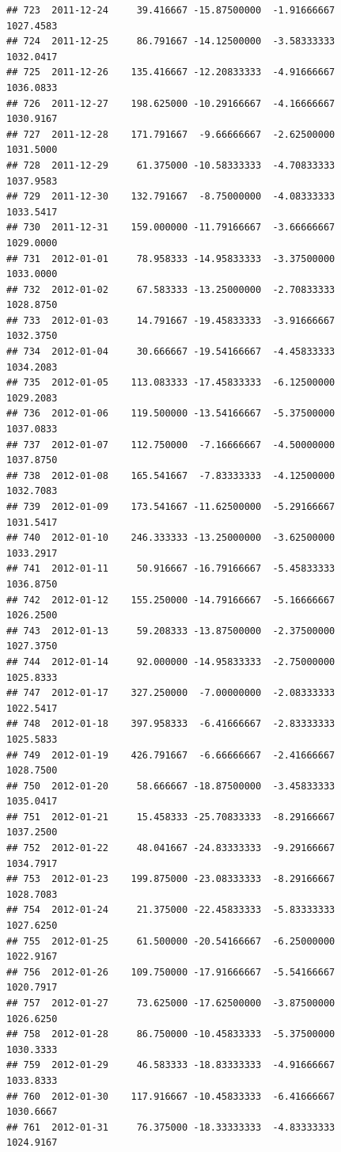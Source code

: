 \documentclass[
]{article}
\begin{document}
\begin{verbatim}
## 723  2011-12-24     39.416667 -15.87500000  -1.91666667    1027.4583
## 724  2011-12-25     86.791667 -14.12500000  -3.58333333    1032.0417
## 725  2011-12-26    135.416667 -12.20833333  -4.91666667    1036.0833
## 726  2011-12-27    198.625000 -10.29166667  -4.16666667    1030.9167
## 727  2011-12-28    171.791667  -9.66666667  -2.62500000    1031.5000
## 728  2011-12-29     61.375000 -10.58333333  -4.70833333    1037.9583
## 729  2011-12-30    132.791667  -8.75000000  -4.08333333    1033.5417
## 730  2011-12-31    159.000000 -11.79166667  -3.66666667    1029.0000
## 731  2012-01-01     78.958333 -14.95833333  -3.37500000    1033.0000
## 732  2012-01-02     67.583333 -13.25000000  -2.70833333    1028.8750
## 733  2012-01-03     14.791667 -19.45833333  -3.91666667    1032.3750
## 734  2012-01-04     30.666667 -19.54166667  -4.45833333    1034.2083
## 735  2012-01-05    113.083333 -17.45833333  -6.12500000    1029.2083
## 736  2012-01-06    119.500000 -13.54166667  -5.37500000    1037.0833
## 737  2012-01-07    112.750000  -7.16666667  -4.50000000    1037.8750
## 738  2012-01-08    165.541667  -7.83333333  -4.12500000    1032.7083
## 739  2012-01-09    173.541667 -11.62500000  -5.29166667    1031.5417
## 740  2012-01-10    246.333333 -13.25000000  -3.62500000    1033.2917
## 741  2012-01-11     50.916667 -16.79166667  -5.45833333    1036.8750
## 742  2012-01-12    155.250000 -14.79166667  -5.16666667    1026.2500
## 743  2012-01-13     59.208333 -13.87500000  -2.37500000    1027.3750
## 744  2012-01-14     92.000000 -14.95833333  -2.75000000    1025.8333
## 747  2012-01-17    327.250000  -7.00000000  -2.08333333    1022.5417
## 748  2012-01-18    397.958333  -6.41666667  -2.83333333    1025.5833
## 749  2012-01-19    426.791667  -6.66666667  -2.41666667    1028.7500
## 750  2012-01-20     58.666667 -18.87500000  -3.45833333    1035.0417
## 751  2012-01-21     15.458333 -25.70833333  -8.29166667    1037.2500
## 752  2012-01-22     48.041667 -24.83333333  -9.29166667    1034.7917
## 753  2012-01-23    199.875000 -23.08333333  -8.29166667    1028.7083
## 754  2012-01-24     21.375000 -22.45833333  -5.83333333    1027.6250
## 755  2012-01-25     61.500000 -20.54166667  -6.25000000    1022.9167
## 756  2012-01-26    109.750000 -17.91666667  -5.54166667    1020.7917
## 757  2012-01-27     73.625000 -17.62500000  -3.87500000    1026.6250
## 758  2012-01-28     86.750000 -10.45833333  -5.37500000    1030.3333
## 759  2012-01-29     46.583333 -18.83333333  -4.91666667    1033.8333
## 760  2012-01-30    117.916667 -10.45833333  -6.41666667    1030.6667
## 761  2012-01-31     76.375000 -18.33333333  -4.83333333    1024.9167

\end{verbatim}
\end{document}
